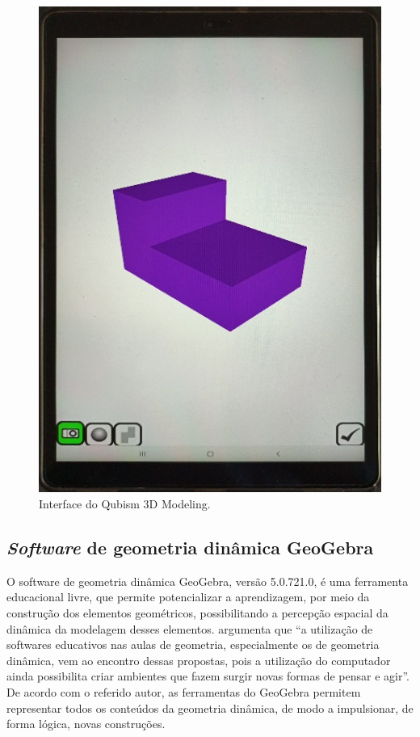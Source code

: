 \begin{figure}[htpb]
\centering
\begin{minipage}{.4\textwidth}
\includegraphics[width=\textwidth]{figures/figure01.jpg}
\caption{Interface do Qubism 3D Modeling.}
\label{fig-01}
\end{minipage}
\end{figure}

\subsection{\emph{Software} de geometria dinâmica GeoGebra}\label{sub-sec-softwaredegeometriadinamica}

O software de geometria dinâmica GeoGebra, versão 5.0.721.0, é uma
ferramenta educacional livre, que permite potencializar a aprendizagem,
por meio da construção dos elementos geométricos, possibilitando a
percepção espacial da dinâmica da modelagem desses elementos. \textcite[p. 2]{alves2007} argumenta que \enquote{a utilização de softwares educativos nas
	aulas de geometria, especialmente os de geometria dinâmica, vem ao
	encontro dessas propostas, pois a utilização do computador ainda
	possibilita criar ambientes que fazem surgir novas formas de pensar e
	agir}. De acordo com o referido autor, as ferramentas do GeoGebra
permitem representar todos os conteúdos da geometria dinâmica, de modo a
impulsionar, de forma lógica, novas construções.

